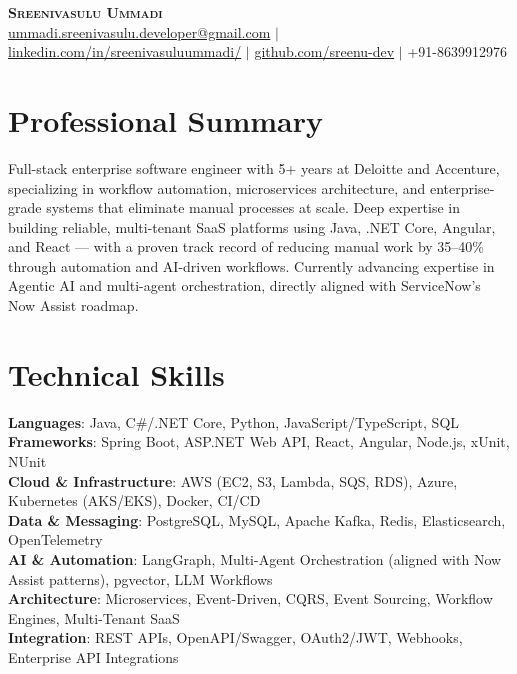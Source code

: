 \documentclass[letterpaper,11pt]{article}
\begin{document}
\begin{center}
    \textbf{\Huge \scshape Sreenivasulu Ummadi} \\ \vspace{5pt}
    \small \href{mailto:ummadi.sreenivasulu.developer@gmail.com}{ummadi.sreenivasulu.developer@gmail.com} $|$
    \href{https://www.linkedin.com/in/sreenivasuluummadi/}{linkedin.com/in/sreenivasuluummadi/} $|$
    \href{https://github.com/sreenu-dev}{github.com/sreenu-dev} $|$
    \small +91-8639912976
\end{center}

\section{Professional Summary}
\small{Full-stack enterprise software engineer with 5+ years at Deloitte and Accenture, specializing in workflow automation, microservices architecture, and enterprise-grade systems that eliminate manual processes at scale. Deep expertise in building reliable, multi-tenant SaaS platforms using Java, .NET Core, Angular, and React --- with a proven track record of reducing manual work by 35--40\% through automation and AI-driven workflows. Currently advancing expertise in Agentic AI and multi-agent orchestration, directly aligned with ServiceNow's Now Assist roadmap.}

\section{Technical Skills}
 \begin{itemize}[leftmargin=0.15in, label={}]
    \small{\item{
     \textbf{Languages}{: Java, C\#/.NET Core, Python, JavaScript/TypeScript, SQL} \\
     \textbf{Frameworks}{: Spring Boot, ASP.NET Web API, React, Angular, Node.js, xUnit, NUnit} \\
     \textbf{Cloud \& Infrastructure}{: AWS (EC2, S3, Lambda, SQS, RDS), Azure, Kubernetes (AKS/EKS), Docker, CI/CD} \\
     \textbf{Data \& Messaging}{: PostgreSQL, MySQL, Apache Kafka, Redis, Elasticsearch, OpenTelemetry} \\
     \textbf{AI \& Automation}{: LangGraph, Multi-Agent Orchestration (aligned with Now Assist patterns), pgvector, LLM Workflows} \\
     \textbf{Architecture}{: Microservices, Event-Driven, CQRS, Event Sourcing, Workflow Engines, Multi-Tenant SaaS} \\
     \textbf{Integration}{: REST APIs, OpenAPI/Swagger, OAuth2/JWT, Webhooks, Enterprise API Integrations}
    }}
 \end{itemize}
\end{document}
